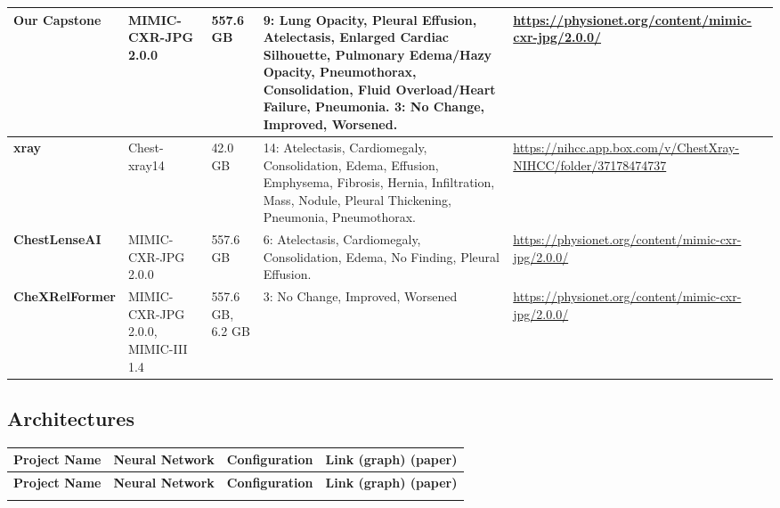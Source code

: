 \documentclass[12pt, titlepage]{article}
\begin{document}
\begin{landscape}
\begin{longtable}{|l|p{3.5cm}|p{1.8cm}|p{6cm}|p{4cm}|}
\textbf{Our Capstone}    & MIMIC-CXR-JPG 2.0.0                                                                                           & 557.6 GB                                                   & 9: Lung Opacity, Pleural Effusion, Atelectasis, Enlarged Cardiac Silhouette, Pulmonary Edema/Hazy Opacity, Pneumothorax, Consolidation, Fluid Overload/Heart Failure, Pneumonia. 3: No Change, Improved, Worsened. & \url{https://physionet.org/content/mimic-cxr-jpg/2.0.0/}        \\ \hline
\textbf{xray}           & Chest-xray14                                                                                                  & 42.0 GB                                                    & 14: Atelectasis, Cardiomegaly, Consolidation, Edema, Effusion, Emphysema, Fibrosis, Hernia, Infiltration, Mass, Nodule, Pleural Thickening, Pneumonia, Pneumothorax.                                                     & \url{https://nihcc.app.box.com/v/ChestXray-NIHCC/folder/37178474737} \\ \hline
\textbf{ChestLenseAI}   & MIMIC-CXR-JPG 2.0.0                                                                                           & 557.6 GB                                                   & 6: Atelectasis, Cardiomegaly, Consolidation, Edema, No Finding, Pleural Effusion.                                                              & \url{https://physionet.org/content/mimic-cxr-jpg/2.0.0/}        \\ \hline
\textbf{CheXRelFormer}  & MIMIC-CXR-JPG 2.0.0, MIMIC-III 1.4                                                                           & 557.6 GB, 6.2 GB                                          & 3: No Change, Improved, Worsened                                                                                                                                                                                                            & \url{https://physionet.org/content/mimic-cxr-jpg/2.0.0/}        \\
\end{longtable}

\newpage
\subsection{Architectures}

\begin{longtable}{|l|l|l|p{10cm}|}
\hline
\textbf{Project Name}   & \textbf{Neural Network}  & \textbf{Configuration}  & \textbf{Link (graph) (paper)}  \\ \hline
\endfirsthead
\hline
\textbf{Project Name}   & \textbf{Neural Network}  & \textbf{Configuration}  & \textbf{Link (graph) (paper)}  \\ \hline
\endhead
\hline
\endfoot


\end{longtable}
\end{landscape}
\end{document}
